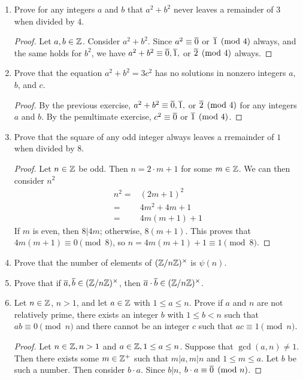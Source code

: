 \begin{enumerate}
	\newpage
	\item Prove for any integers $a$ and $b$ that $a^2+b^2$ never leaves a remainder of $3$ when divided by $4$.
	\begin{proof}
		Let $a,b\in \mathbb{Z}$.  Consider $a^2+b^2$.  Since $a^2\equiv \overline{0}$ or $\overline{1}\pmod 4$ always, and the same holds for $b^2$, we have $a^2 + b^2 \equiv \overline{0}, \overline{1},$ or $\overline{2}\pmod 4$ always. 
	\end{proof}
	\item Prove that the equation $a^2+b^2 = 3c^2$ has no solutions in nonzero integers $a$, $b$, and $c$.
	\begin{proof}
		By the previous exercise, $a^2+b^2 \equiv \overline{0}, \overline{1},$ or $\overline{2}\pmod 4$ for any integers $a$ and $b$.  By the penultimate exercise, $c^2 \equiv \overline{0}$ or $\overline{1} \pmod 4$.
		
%	
%	
%	
%	
%	
%	
	\end{proof}
	\item Prove that the square of any odd integer always leaves a rremainder of $1$ when divided by $8$.
	\begin{proof}
		Let $n\in\mathbb{Z}$ be odd.  Then $n = 2\cdot m+1$ for some $m\in\mathbb{Z}$.  We can then consider $n^2$
		\begin{align*}
		n^2 = & (2m+1)^2\\
		 = & 4m^2 + 4m + 1\\
		 = & 4m(m + 1) + 1
		\end{align*}
		If $m$ is even, then $8|4m$; otherwise, $8(m+1)$.  This proves that $4m(m+1) \equiv 0 \pmod 8$, so $n = 4m(m+1) + 1\equiv 1 \pmod 8$.
	\end{proof}
	\item Prove that the number of elements of $(\mathbb{Z}/n\mathbb{Z})^\times$ is $\psi(n)$.
	\item Prove that if $\overline{a},\overline{b}\in(\mathbb{Z}/n\mathbb{Z})^\times$, then $\overline{a}\cdot\overline{b}\in(\mathbb{Z}/n\mathbb{Z})^\times$.
	\item Let $n\in\mathbb{Z}$, $n>1$, and let $a\in\mathbb{Z}$ with $1\leq a \leq n$.  Prove if $a$ and $n$ are not relatively prime, there exists an integer $b$ with $1\leq b<n$ such that $ab\equiv 0 \pmod n$ and there cannot be an integer $c$ such that $ac\equiv 1 \pmod n$.
	\begin{proof}
		Let $n\in\mathbb{Z},n>1$ and $a\in\mathbb{Z},1\leq a\leq n$.
		Suppose that $\gcd(a,n) \neq 1$.  Then there exists some $m\in\mathbb{Z}^+$ such that $m|a, m|n$ and $1\leq m\leq a$.  
		Let $b$ be such a number.  
		Then consider $b\cdot a$.  
		Since $b|n$, $b \cdot a \equiv \overline{0} \pmod n$.
		

\end{proof}
\end{enumerate}
